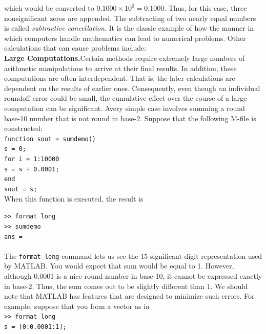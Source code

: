 \documentclass[../main.tex]{subfiles}
\begin{document}
\noindent
which would be converted to $0.1000 \times 10^0 = 0.1000$. Thus, for this case, three nonsignificant
zeros are appended.
The subtracting of two nearly equal numbers is called \emph{subtractive cancellation}. It is
the classic example of how the manner in which computers handle mathematics can lead to
numerical problems. Other calculations that can cause problems include:\\

\noindent
\textbf{Large Computations.}\quad Certain methods require extremely large numbers of arithmetic
manipulations to arrive at their final results. In addition, these computations are often interdependent.
That is, the later calculations are dependent on the results of earlier ones. Consequently,
even though an individual roundoff error could be small, the cumulative effect
over the course of a large computation can be significant. Avery simple case involves summing
a round base-10 number that is not round in base-2. Suppose that the following M-file
is constructed:\\

\texttt{function sout = sumdemo()\\
\indent s = 0;\\
\indent for i = 1:10000\\
\indent\hspace{5 mm} s = s + 0.0001;\\
\indent end\\
\indent sout = s;}\\

\noindent
When this function is executed, the result is

\texttt{>> format long\\
\indent >> sumdemo\\
\indent ans =\\
\indent{}}\\

The \texttt{format long} command lets us see the 15 significant-digit representation used
by MATLAB. You would expect that sum would be equal to 1. However, although
0.0001 is a nice round number in base-10, it cannot be expressed exactly in base-2. Thus,
the sum comes out to be slightly different than 1. We should note that MATLAB has features
that are designed to minimize such errors. For example, suppose that you form a
vector as in\\

\texttt{>> format long\\
\indent s = [0:0.0001:1];}\\
\end{document}

